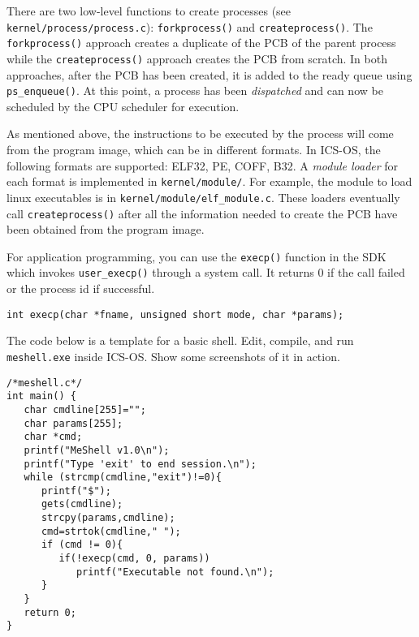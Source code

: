 \documentclass[a4paper, 11pt,oneside]{article}
\begin{document}
There are two low-level functions to create processes (see \texttt{kernel/process/process.c}): \texttt{forkprocess()} and \texttt{createprocess()}. 
The \texttt{forkprocess()} approach creates a duplicate of the PCB of the parent process while the \texttt{createprocess()} approach creates the PCB from scratch. In both approaches, after the PCB has been created, it is added to the ready queue using \texttt{ps\_enqueue()}. At this point, a process has been \textit{dispatched} and can now be scheduled by the CPU scheduler for execution. 

As mentioned above, the instructions to be executed by the process will come from the program image, which can 
be in different formats. In ICS-OS, the following formats are supported: ELF32, PE, COFF, B32. A \textit{module loader} for each format is implemented in \texttt{kernel/module/}. For example, the module to load linux executables is in \texttt{kernel/module/elf\_module.c}. These loaders 
eventually call \texttt{createprocess()} after all the information needed to create the PCB have been obtained from the program image.

For application programming, you can use the \texttt{execp()} function in the SDK which invokes  
\texttt{user\_execp()} through a system call. It returns 0 if the call failed or the process id if successful. 

\begin{Verbatim}[frame=single]
int execp(char *fname, unsigned short mode, char *params);
\end{Verbatim}

The code below is a template for a basic shell. Edit, compile, and run \texttt{meshell.exe} inside ICS-OS. Show some screenshots of it in action.  

\begin{Verbatim}[frame=single]
/*meshell.c*/
int main() {
   char cmdline[255]="";
   char params[255];
   char *cmd;
   printf("MeShell v1.0\n");
   printf("Type 'exit' to end session.\n");
   while (strcmp(cmdline,"exit")!=0){
      printf("$");
      gets(cmdline);
      strcpy(params,cmdline);
      cmd=strtok(cmdline," ");
      if (cmd != 0){ 
         if(!execp(cmd, 0, params))
            printf("Executable not found.\n");
      }   
   }   
   return 0;
}

\end{Verbatim}
\end{document}
